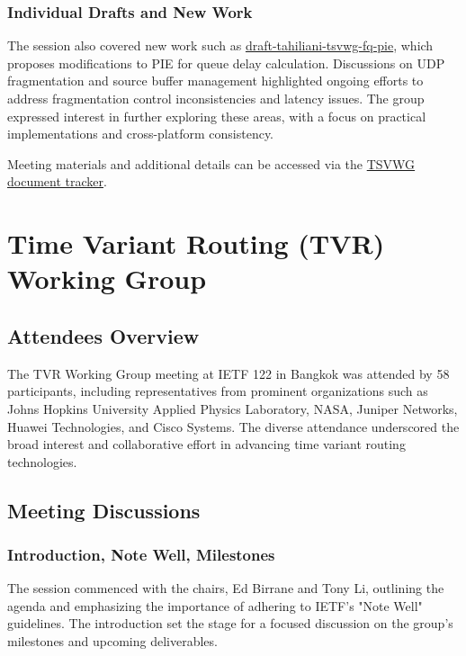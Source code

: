 \documentclass{article}
\begin{document}
\subsubsection{Individual Drafts and New Work}
The session also covered new work such as \href{https://datatracker.ietf.org/doc/html/draft-tahiliani-tsvwg-fq-pie}{draft-tahiliani-tsvwg-fq-pie}, which proposes modifications to PIE for queue delay calculation. Discussions on UDP fragmentation and source buffer management highlighted ongoing efforts to address fragmentation control inconsistencies and latency issues. The group expressed interest in further exploring these areas, with a focus on practical implementations and cross-platform consistency.

Meeting materials and additional details can be accessed via the \href{https://datatracker.ietf.org/wg/tsvwg/documents/}{TSVWG document tracker}.



\newpage

\section{Time Variant Routing (TVR) Working Group}

\subsection{Attendees Overview}
The TVR Working Group meeting at IETF 122 in Bangkok was attended by 58 participants, including representatives from prominent organizations such as Johns Hopkins University Applied Physics Laboratory, NASA, Juniper Networks, Huawei Technologies, and Cisco Systems. The diverse attendance underscored the broad interest and collaborative effort in advancing time variant routing technologies.

\subsection{Meeting Discussions}

\subsubsection{Introduction, Note Well, Milestones}
The session commenced with the chairs, Ed Birrane and Tony Li, outlining the agenda and emphasizing the importance of adhering to IETF's "Note Well" guidelines. The introduction set the stage for a focused discussion on the group's milestones and upcoming deliverables.
\end{document}

